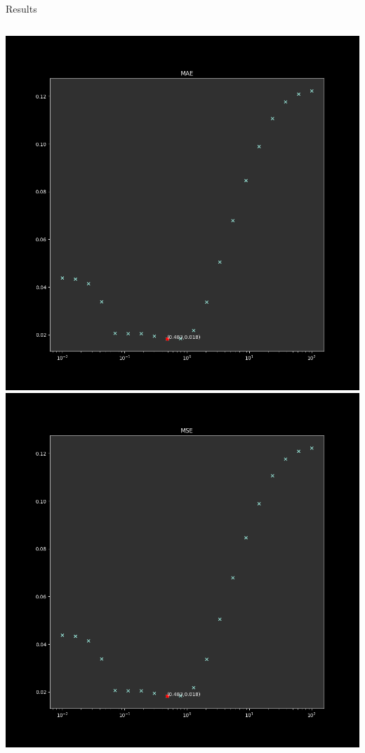 \begin{frame}{Results}
\centering
\begin{columns}
\centering
\includegraphics[scale=0.25]{images/results/bm3d/bm3d_mae.png}
\centering
\includegraphics[scale=0.25]{images/results/bm3d/bm3d_mse.png}
\end{columns}
\end{frame}

